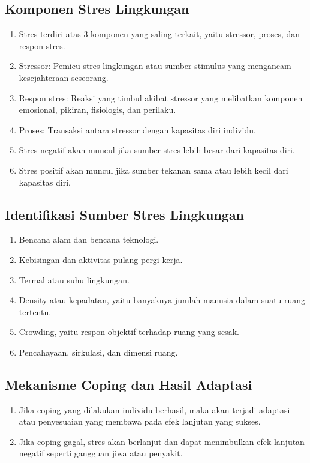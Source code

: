 \documentclass[../manperil.tex]{subfiles}
\begin{document}
\subsection{Komponen Stres Lingkungan}
\begin{enumerate}
	\item Stres terdiri atas 3 komponen yang saling terkait, yaitu stressor, proses, dan respon stres.
	\item Stressor: Pemicu stres lingkungan atau sumber stimulus yang mengancam kesejahteraan seseorang.
	\item Respon stres: Reaksi yang timbul akibat stressor yang melibatkan komponen emosional, pikiran, fisiologis, dan perilaku.
	\item Proses: Transaksi antara stressor dengan kapasitas diri individu.
	\item Stres negatif akan muncul jika sumber stres lebih besar dari kapasitas diri.
	\item Stres positif akan muncul jika sumber tekanan sama atau lebih kecil dari kapasitas diri.
\end{enumerate}
\subsection{Identifikasi Sumber Stres Lingkungan}
\begin{enumerate}
	\item Bencana alam dan bencana teknologi.
	\item Kebisingan dan aktivitas pulang pergi kerja.
	\item Termal atau suhu lingkungan.
	\item Density atau kepadatan, yaitu banyaknya jumlah manusia dalam suatu ruang tertentu.
	\item Crowding, yaitu respon objektif terhadap ruang yang sesak.
	\item Pencahayaan, sirkulasi, dan dimensi ruang.
\end{enumerate}

\subsection{Mekanisme Coping dan Hasil Adaptasi}
\begin{enumerate}
	\item Jika coping yang dilakukan individu berhasil, maka akan terjadi adaptasi atau penyesuaian yang membawa pada efek lanjutan yang sukses.
	\item Jika coping gagal, stres akan berlanjut dan dapat menimbulkan efek lanjutan negatif seperti gangguan jiwa atau penyakit.
\end{enumerate}
\end{document}
